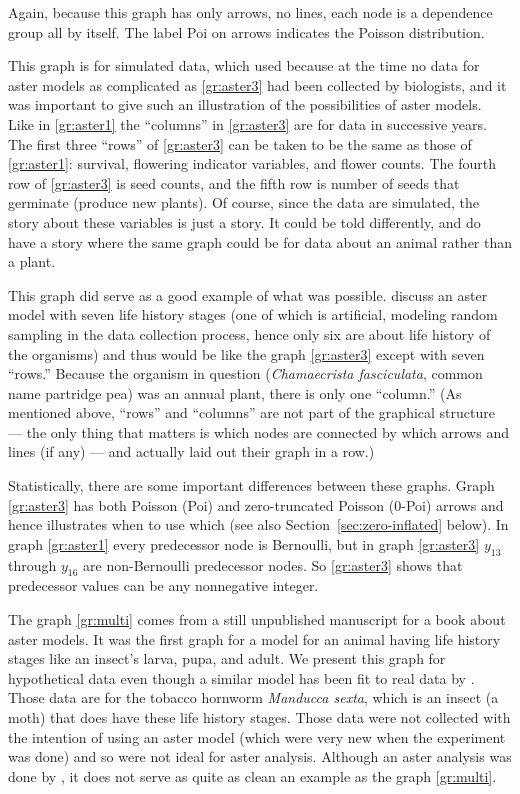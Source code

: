 Again, because this graph has only arrows, no lines, each node is
a dependence group all by itself.  The label Poi on arrows indicates
the Poisson distribution.

This graph is for simulated data, which \citet{aster3} used because
at the time no data for aster models as complicated as \eqref{gr:aster3} had
been collected by biologists, and it was important to give such
an illustration of the possibilities of aster models.
Like in \eqref{gr:aster1} the ``columns'' in \eqref{gr:aster3} are for
data in successive years.  The first three ``rows'' of \eqref{gr:aster3}
can be taken to be the same as those of \eqref{gr:aster1}: survival,
flowering indicator variables, and flower counts.  The fourth row of
\eqref{gr:aster3} is seed counts, and the fifth row is number of seeds
that germinate (produce new plants).  Of course, since the data
are simulated, the story about these variables is just a story.
It could be told differently, and \citet{aster3} do have a story
where the same graph could be for data about an animal rather than a plant.

This graph did serve as a good example of what was possible.
\citet*[in the on-line appendix]{stanton-geddes-tiffin-shaw}
discuss an aster model with seven life history stages (one of which is
artificial, modeling random sampling in the data collection process, hence
only six are about life history of the organisms) and thus would be
like the graph \eqref{gr:aster3} except with seven ``rows.''
Because the organism in question (\emph{Chamaecrista fasciculata}, common
name partridge pea) was an annual plant, there is only one ``column.''
(As mentioned above, ``rows'' and ``columns'' are not part of the graphical
structure --- the only thing that matters is which nodes are connected
by which arrows and lines (if any) ---
and \citeauthor{stanton-geddes-tiffin-shaw} actually
laid out their graph in a row.)

Statistically, there are some important differences between these graphs.
Graph \eqref{gr:aster3} has both Poisson (Poi) and zero-truncated Poisson
(0-Poi) arrows and hence illustrates when to use which
(see also Section~\ref{sec:zero-inflated} below).
In graph \eqref{gr:aster1} every predecessor node is Bernoulli,
but in graph \eqref{gr:aster3} $y_{13}$ through $y_{16}$ are non-Bernoulli
predecessor nodes.  So \eqref{gr:aster3} shows that predecessor values can
be any nonnegative integer.

The graph \eqref{gr:multi} comes from a still unpublished manuscript for a book
about aster models.  It was the first graph for a model for an animal having
life history stages like an insect's larva, pupa, and adult.  We present this
graph for hypothetical data even though a similar model has been fit to real
data by \citet{aster-hornworm}.  Those data are for the tobacco hornworm
\emph{Manducca sexta}, which is an insect (a moth) that does have these life
history stages.  Those data were not collected with the intention of using
an aster model (which were very new when the experiment was done) and so were
not ideal for aster analysis.  Although an aster analysis was done by
\citet{aster-hornworm}, it does not serve as quite as clean an example as
the graph \eqref{gr:multi}.

